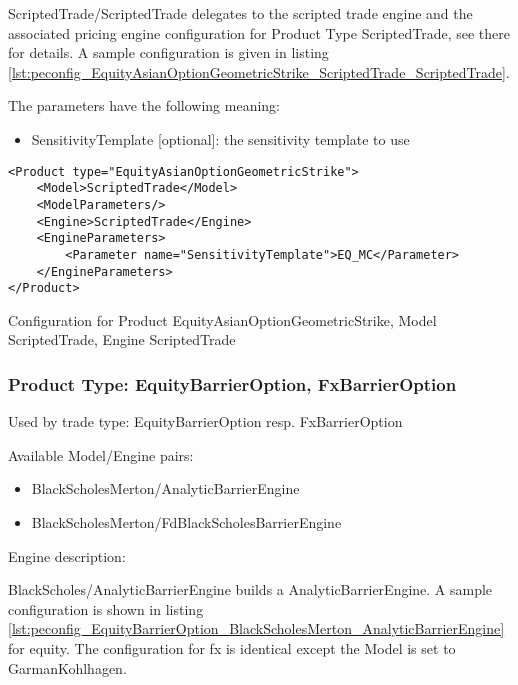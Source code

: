 ScriptedTrade/ScriptedTrade delegates to the scripted trade engine and the associated pricing engine configuration for
Product Type ScriptedTrade, see there for details. A sample configuration is given in listing
\ref{lst:peconfig_EquityAsianOptionGeometricStrike_ScriptedTrade_ScriptedTrade}.

The parameters have the following meaning:

\begin{itemize}
\item SensitivityTemplate [optional]: the sensitivity template to use 
\end{itemize}

\begin{longlisting}
\begin{verbatim}
<Product type="EquityAsianOptionGeometricStrike">
    <Model>ScriptedTrade</Model>
    <ModelParameters/>
    <Engine>ScriptedTrade</Engine>
    <EngineParameters>
        <Parameter name="SensitivityTemplate">EQ_MC</Parameter>
    </EngineParameters>
</Product>
\end{verbatim}
\caption{Configuration for Product EquityAsianOptionGeometricStrike, Model ScriptedTrade, Engine ScriptedTrade}
\label{lst:peconfig_EquityAsianOptionGeometricStrike_ScriptedTrade_ScriptedTrade}
\end{longlisting}

\subsubsection{Product Type: EquityBarrierOption, FxBarrierOption}

Used by trade type: EquityBarrierOption resp. FxBarrierOption

Available Model/Engine pairs:

\begin{itemize}
\item BlackScholesMerton/AnalyticBarrierEngine
\item BlackScholesMerton/FdBlackScholesBarrierEngine
\end{itemize}

Engine description:

BlackScholes/AnalyticBarrierEngine builds a AnalyticBarrierEngine. A sample configuration is shown in listing
\ref{lst:peconfig_EquityBarrierOption_BlackScholesMerton_AnalyticBarrierEngine} for equity. The configuration for fx is
identical except the Model is set to GarmanKohlhagen.

